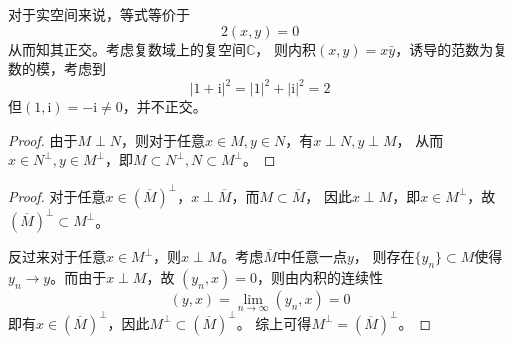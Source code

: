 \documentclass[cn]{homework}
\newcommand{\img}{\mathrm i}
\begin{document}
    \problem
    对于实空间来说，等式等价于
    \[2(x,y)=0\]
    从而知其正交。考虑复数域上的复空间$\mathbb C$，
    则内积$(x,y)=x\bar y$，诱导的范数为复数的模，考虑到
    \[|1+\img|^2=|1|^2+|\img|^2=2\]
    但$(1,\img)=-\img\neq 0$，并不正交。

    \problem
    \begin{subproblem}
        \item
        \begin{proof}
        由于$M\perp N$，则对于任意$x\in M,y\in N$，有$x\perp N,y\perp M$，
        从而$x\in N^{\perp},y\in M^{\perp}$，即$M\subset N^{\perp},N\subset M^{\perp}$。
        \end{proof}

        \item
        \begin{proof}
            \newcommand{\cl}[1]{\overline{#1}}
            对于任意$x\in(\cl M)^{\perp}$，$x\perp\cl M$，而$M\subset\cl M$，
            因此$x\perp M$，即$x\in M^\perp$，故$(\cl M)^\perp\subset M^\perp$。

            反过来对于任意$x\in M^\perp$，则$x\perp M$。考虑$\cl M$中任意一点$y$，
            则存在$\{y_n\}\subset M$使得$y_n\to y$。而由于$x\perp M$，故
            $(y_n,x)=0$，则由内积的连续性
            \[(y,x)=\lim_{n\to\infty}(y_n,x)=0\]
            即有$x\in(\cl M)^\perp$，因此$M^\perp\subset(\cl M)^\perp$。
            综上可得$M^\perp=(\cl M)^\perp$。
        \end{proof}
        
    \end{subproblem}
\end{document}
